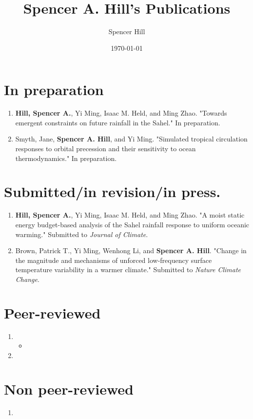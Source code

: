 \documentclass{article}
\author{Spencer Hill}
\date{\today}
\title{Spencer A. Hill's Publications}
\begin{document}
\maketitle
\nobibliography*
\section*{In preparation}
\label{sec:org35d25d9}
\begin{enumerate}
\item \textbf{Hill, Spencer A.}, Yi Ming, Isaac M. Held, and Ming Zhao.  "Towards emergent
constraints on future rainfall in the Sahel."  In preparation.
\item Smyth, Jane, \textbf{Spencer A. Hill}, and Yi Ming.  "Simulated tropical circulation
responses to orbital precession and their sensitivity to ocean
thermodynamics."  In preparation.
\end{enumerate}
\section*{Submitted/in revision/in press.}
\label{sec:org4245e6c}
\begin{enumerate}
\item \textbf{Hill, Spencer A.}, Yi Ming, Isaac M. Held, and Ming Zhao.  "A moist static
energy budget-based analysis of the Sahel rainfall response to uniform
oceanic warming."  Submitted to \emph{Journal of
Climate}.
\item Brown, Patrick T., Yi Ming, Wenhong Li, and \textbf{Spencer A. Hill}.  "Change in the
magnitude and mechanisms of unforced low-frequency surface temperature
variability in a warmer climate."  Submitted to \emph{Nature Climate Change}.
\end{enumerate}
\section*{Peer-reviewed}
\label{sec:orgb1de22e}
\begin{enumerate}
\item {}
\begin{itemize}
\item {}
\end{itemize}
\item {}
\end{enumerate}

\section*{Non peer-reviewed}
\label{sec:orga93dd84}
\begin{enumerate}
\item {}
\end{enumerate}
\end{document}
